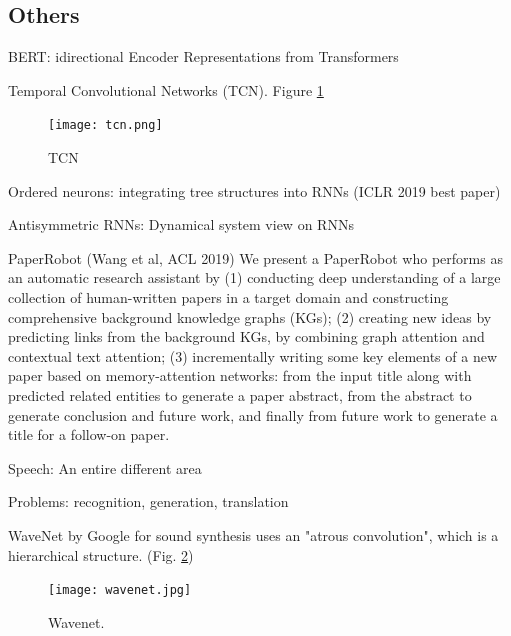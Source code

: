 \documentclass[english]{article}
\begin{document}
\benum 
\item 
\eenum 

 
\eenum 


\subsection{Others}


\benum

\item BERT: idirectional Encoder Representations from Transformers

\item Temporal Convolutional Networks (TCN). Figure \ref{TCN}


\begin{figure}
  \centering
  \texttt{[image: tcn.png]}
    \caption{TCN}
    \label{TCN}
\end{figure}



\item Ordered neurons: integrating tree structures into RNNs (ICLR 2019 best paper)

\item Antisymmetric RNNs: Dynamical system view on RNNs

\item PaperRobot (Wang et al, ACL 2019) We present a PaperRobot who performs as an automatic research assistant by (1) conducting deep understanding of a large collection of human-written papers in a target domain and constructing comprehensive background knowledge graphs (KGs); (2) creating new ideas by predicting links from the background KGs, by combining graph attention and contextual text attention; (3) incrementally writing some key elements of a new paper based on memory-attention networks: from the input title along with predicted related entities to generate a paper abstract, from the abstract to generate conclusion and future work, and finally from future work to generate a title for a follow-on paper. 

\item Speech: An entire different area

Problems: recognition, generation, translation


WaveNet by Google for sound synthesis uses an "atrous convolution", which is a hierarchical structure. (Fig. \ref{wavenet})

\begin{figure}
  \centering
  \texttt{[image: wavenet.jpg]}
    \caption{Wavenet.}
    \label{wavenet}
\end{figure}
\end{document}
